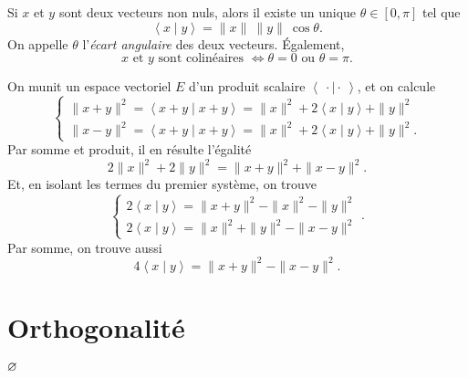 \begin{crlr}
	Si $x$\/ et $y$\/ sont deux vecteurs non nuls, alors il existe un unique $\theta \in [0,\pi]$\/ tel que \[
		\left<x  \mid y \right> = \|x\|\:\|y\|\: \cos \theta
	.\] On appelle $\theta$\/ l'\textit{écart angulaire} des deux vecteurs. Également, \[
		x \text{ et } y \text{ sont colinéaires } \iff \theta = 0 \text{ ou } \theta = \pi
	.\]
\end{crlr}

\begin{rmk}
	On munit un espace vectoriel $E$\/ d'un produit scalaire $\left<\:\cdot  \mid \cdot \: \right>$, et on calcule \[
		\begin{cases}
			\|x + y\|^2 = \left<x + y  \mid x + y \right> = \|x\|^2 + 2\left<x  \mid y \right> + \|y\|^2\\
			\|x - y\|^2 = \left<x + y  \mid x + y \right> = \|x\|^2 + 2\left<x  \mid y \right> + \|y\|^2.
		\end{cases}
	\]
	Par somme et produit, il en résulte l'égalité \[
			2\|x\|^2 + 2\|y\|^2 = \|x + y\|^2 + \|x - y\|^2
	.\]
	Et, en isolant les termes du premier système, on trouve \[
		\begin{cases}
			2\left<x \mid y \right> = \|x + y\|^2 - \|x\|^2 - \|y\|^2\\
			2\left<x \mid y \right> =  \|x\|^2 + \|y\|^2 - \|x - y\|^2
		\end{cases}
	.\] Par somme, on trouve aussi \[
		4\left<x \mid y \right> = \|x+y\|^2 - \|x - y\|^2
	.\]
\end{rmk}

\section{Orthogonalité}

\begin{defn}
	$\varnothing$
\end{defn}

